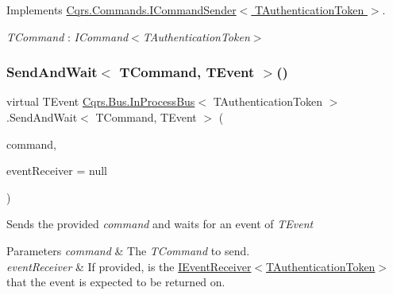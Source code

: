 Implements \hyperlink{interfaceCqrs_1_1Commands_1_1ICommandSender_a3fb3ec40a3e862f721a7c9204e67e832}{Cqrs.\+Commands.\+I\+Command\+Sender$<$ T\+Authentication\+Token $>$}.

\begin{Desc}
\item[Type Constraints]\begin{description}
\item[{\em T\+Command} : {\em I\+Command$<$T\+Authentication\+Token$>$}]\end{description}
\end{Desc}
\mbox{\label{classCqrs_1_1Bus_1_1InProcessBus_a506d617dc7ec3838791a91e09b73b8ce}} 
\subsubsection{\texorpdfstring{Send\+And\+Wait$<$ T\+Command, T\+Event $>$()}{SendAndWait< TCommand, TEvent >()}\hspace{0.1cm}{\footnotesize\ttfamily [1/6]}}
{\footnotesize\ttfamily virtual T\+Event \hyperlink{classCqrs_1_1Bus_1_1InProcessBus}{Cqrs.\+Bus.\+In\+Process\+Bus}$<$ T\+Authentication\+Token $>$.Send\+And\+Wait$<$ T\+Command, T\+Event $>$ (\begin{DoxyParamCaption}\item[{T\+Command}]{command,  }\item[{\hyperlink{interfaceCqrs_1_1Events_1_1IEventReceiver}{I\+Event\+Receiver}$<$ T\+Authentication\+Token $>$}]{event\+Receiver = {\ttfamily null} }\end{DoxyParamCaption})\hspace{0.3cm}{\ttfamily [virtual]}}



Sends the provided {\itshape command}  and waits for an event of {\itshape T\+Event}  


\begin{DoxyParams}{Parameters}
{\em command} & The {\itshape T\+Command}  to send.\\
\hline
{\em event\+Receiver} & If provided, is the \hyperlink{interfaceCqrs_1_1Events_1_1IEventReceiver}{I\+Event\+Receiver$<$\+T\+Authentication\+Token$>$} that the event is expected to be returned on.\\
\hline
\end{DoxyParams}


